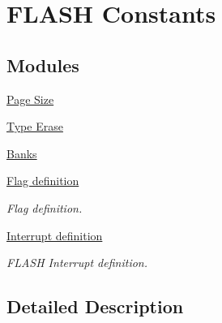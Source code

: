 \hypertarget{group___f_l_a_s_h_ex___constants}{}\section{F\+L\+A\+SH Constants}
\label{group___f_l_a_s_h_ex___constants}
\subsection*{Modules}
\begin{DoxyCompactItemize}
\item 
\hyperlink{group___f_l_a_s_h_ex___page___size}{Page Size}
\item 
\hyperlink{group___f_l_a_s_h_ex___type___erase}{Type Erase}
\item 
\hyperlink{group___f_l_a_s_h_ex___banks}{Banks}
\item 
\hyperlink{group___f_l_a_s_h___flag__definition}{Flag definition}
\begin{DoxyCompactList}\small\item\em Flag definition. \end{DoxyCompactList}\item 
\hyperlink{group___f_l_a_s_h___interrupt__definition}{Interrupt definition}
\begin{DoxyCompactList}\small\item\em F\+L\+A\+SH Interrupt definition. \end{DoxyCompactList}\end{DoxyCompactItemize}


\subsection{Detailed Description}
